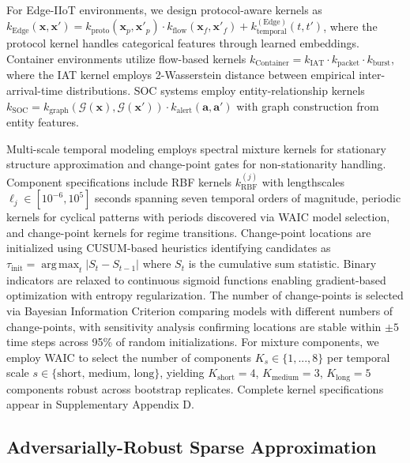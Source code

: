 \documentclass[review,12pt]{elsarticle}
\DeclareMathOperator*{\argmax}{arg\,max}
\begin{document}
\begingroup\sloppy
For Edge-IIoT environments, we design protocol-aware kernels as
\(k_{\text{Edge}}(\mathbf{x},\mathbf{x}') = k_{\text{proto}}(\mathbf{x}_p,\allowbreak \mathbf{x}'_p)\cdot k_{\text{flow}}(\mathbf{x}_f,\allowbreak \mathbf{x}'_f) + k_{\text{temporal}}^{(\text{Edge})}(t,\allowbreak t')\),
where the protocol kernel handles categorical features through learned embeddings.
Container environments utilize flow-based kernels
\(k_{\text{Container}} = k_{\text{IAT}}\cdot k_{\text{packet}}\cdot k_{\text{burst}}\),
where the IAT kernel employs 2-Wasserstein distance between empirical inter-arrival-time distributions.
SOC systems employ entity-relationship kernels
\(k_{\text{SOC}} = k_{\text{graph}}(\mathcal{G}(\mathbf{x}),\allowbreak \mathcal{G}(\mathbf{x}'))\cdot k_{\text{alert}}(\mathbf{a},\allowbreak \mathbf{a}')\)
with graph construction from entity features.
\par\endgroup


Multi-scale temporal modeling employs spectral mixture kernels for stationary structure approximation and change-point gates for non-stationarity handling. Component specifications include RBF kernels $k_{\mathrm{RBF}}^{(j)}$ with lengthscales $\ell_j \in [10^{-6},10^{5}]$ seconds spanning seven temporal orders of magnitude, periodic kernels for cyclical patterns with periods discovered via WAIC model selection, and change-point kernels for regime transitions. Change-point locations are initialized using CUSUM-based heuristics identifying candidates as $\tau_{\text{init}} = \argmax_t |S_t - S_{t-1}|$ where $S_t$ is the cumulative sum statistic. Binary indicators are relaxed to continuous sigmoid functions enabling gradient-based optimization with entropy regularization. The number of change-points is selected via Bayesian Information Criterion comparing models with different numbers of change-points, with sensitivity analysis confirming locations are stable within $\pm 5$ time steps across 95\% of random initializations. For mixture components, we employ WAIC to select the number of components $K_s \in \{1,...,8\}$ per temporal scale $s \in \{\text{short, medium, long}\}$, yielding $K_{\text{short}}=4$, $K_{\text{medium}}=3$, $K_{\text{long}}=5$ components robust across bootstrap replicates. Complete kernel specifications appear in Supplementary Appendix D.

\subsection{Adversarially-Robust Sparse Approximation}
\end{document}
